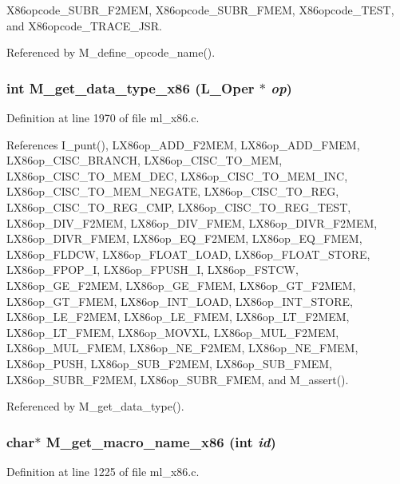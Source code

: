 X86opcode\_\-SUBR\_\-F2MEM, X86opcode\_\-SUBR\_\-FMEM, X86opcode\_\-TEST, and X86opcode\_\-TRACE\_\-JSR.

Referenced by M\_\-define\_\-opcode\_\-name().
\subsubsection{\setlength{\rightskip}{0pt plus 5cm}int M\_\-get\_\-data\_\-type\_\-x86 (L\_\-Oper $\ast$ {\em op})}\label{ml__x86_8c_f898a4e675ba9b4f1609ff4f9ac62415}




Definition at line 1970 of file ml\_\-x86.c.

References I\_\-punt(), LX86op\_\-ADD\_\-F2MEM, LX86op\_\-ADD\_\-FMEM, LX86op\_\-CISC\_\-BRANCH, LX86op\_\-CISC\_\-TO\_\-MEM, LX86op\_\-CISC\_\-TO\_\-MEM\_\-DEC, LX86op\_\-CISC\_\-TO\_\-MEM\_\-INC, LX86op\_\-CISC\_\-TO\_\-MEM\_\-NEGATE, LX86op\_\-CISC\_\-TO\_\-REG, LX86op\_\-CISC\_\-TO\_\-REG\_\-CMP, LX86op\_\-CISC\_\-TO\_\-REG\_\-TEST, LX86op\_\-DIV\_\-F2MEM, LX86op\_\-DIV\_\-FMEM, LX86op\_\-DIVR\_\-F2MEM, LX86op\_\-DIVR\_\-FMEM, LX86op\_\-EQ\_\-F2MEM, LX86op\_\-EQ\_\-FMEM, LX86op\_\-FLDCW, LX86op\_\-FLOAT\_\-LOAD, LX86op\_\-FLOAT\_\-STORE, LX86op\_\-FPOP\_\-I, LX86op\_\-FPUSH\_\-I, LX86op\_\-FSTCW, LX86op\_\-GE\_\-F2MEM, LX86op\_\-GE\_\-FMEM, LX86op\_\-GT\_\-F2MEM, LX86op\_\-GT\_\-FMEM, LX86op\_\-INT\_\-LOAD, LX86op\_\-INT\_\-STORE, LX86op\_\-LE\_\-F2MEM, LX86op\_\-LE\_\-FMEM, LX86op\_\-LT\_\-F2MEM, LX86op\_\-LT\_\-FMEM, LX86op\_\-MOVXL, LX86op\_\-MUL\_\-F2MEM, LX86op\_\-MUL\_\-FMEM, LX86op\_\-NE\_\-F2MEM, LX86op\_\-NE\_\-FMEM, LX86op\_\-PUSH, LX86op\_\-SUB\_\-F2MEM, LX86op\_\-SUB\_\-FMEM, LX86op\_\-SUBR\_\-F2MEM, LX86op\_\-SUBR\_\-FMEM, and M\_\-assert().

Referenced by M\_\-get\_\-data\_\-type().
\subsubsection{\setlength{\rightskip}{0pt plus 5cm}char$\ast$ M\_\-get\_\-macro\_\-name\_\-x86 (int {\em id})}\label{ml__x86_8c_29e3c015489d3b9770e2253121536275}




Definition at line 1225 of file ml\_\-x86.c.

